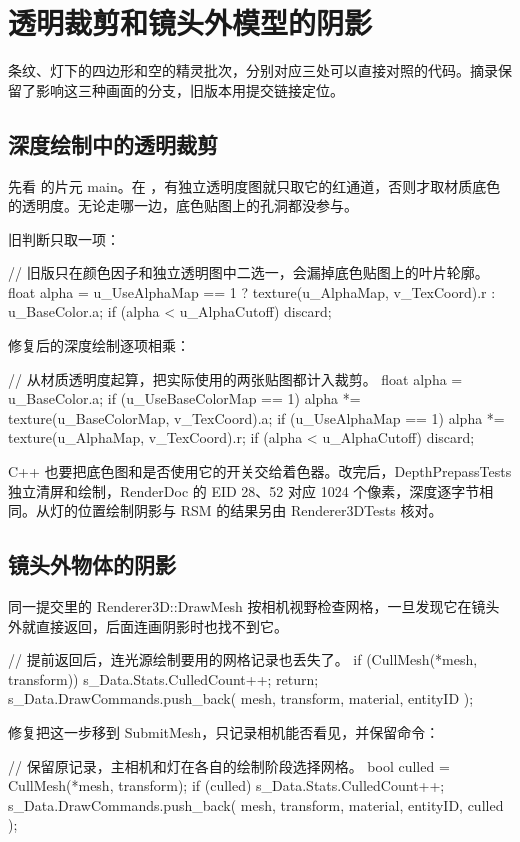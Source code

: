 \section{透明裁剪和镜头外模型的阴影}
条纹、灯下的四边形和空的精灵批次，分别对应三处可以直接对照的代码。摘录保留了影响这三种画面的分支，旧版本用提交链接定位。

\subsection{深度绘制中的透明裁剪}
先看  的片元 main。在 ，有独立透明度图就只取它的红通道，否则才取材质底色的透明度。无论走哪一边，底色贴图上的孔洞都没参与。

旧判断只取一项：
\begin{Code}
// 旧版只在颜色因子和独立透明图中二选一，会漏掉底色贴图上的叶片轮廓。
float alpha = u_UseAlphaMap == 1
    ? texture(u_AlphaMap, v_TexCoord).r
    : u_BaseColor.a;
if (alpha < u_AlphaCutoff)
    discard;
\end{Code}

修复后的深度绘制逐项相乘：
\begin{Code}
// 从材质透明度起算，把实际使用的两张贴图都计入裁剪。
float alpha = u_BaseColor.a;
if (u_UseBaseColorMap == 1)
    alpha *= texture(u_BaseColorMap, v_TexCoord).a;
if (u_UseAlphaMap == 1)
    alpha *= texture(u_AlphaMap, v_TexCoord).r;
if (alpha < u_AlphaCutoff)
    discard;
\end{Code}

C++ 也要把底色图和是否使用它的开关交给着色器。改完后，DepthPrepassTests 独立清屏和绘制，RenderDoc 的 EID 28、52 对应 1024 个像素，深度逐字节相同。从灯的位置绘制阴影与 RSM 的结果另由 Renderer3DTests 核对。

\newpage
\subsection{镜头外物体的阴影}
同一提交里的 Renderer3D::DrawMesh 按相机视野检查网格，一旦发现它在镜头外就直接返回，后面连画阴影时也找不到它。
\begin{Code}
// 提前返回后，连光源绘制要用的网格记录也丢失了。
if (CullMesh(*mesh, transform)) { s_Data.Stats.CulledCount++; return; }
s_Data.DrawCommands.push_back({ mesh, transform, material, entityID });
\end{Code}

修复把这一步移到 SubmitMesh，只记录相机能否看见，并保留命令：
\begin{Code}
// 保留原记录，主相机和灯在各自的绘制阶段选择网格。
bool culled = CullMesh(*mesh, transform);
if (culled)
    s_Data.Stats.CulledCount++;
s_Data.DrawCommands.push_back({ mesh, transform, material, entityID, culled });
\end{Code}

